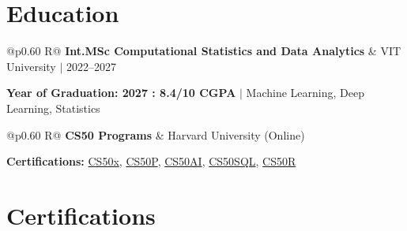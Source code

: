 \documentclass[a4paper,11pt]{article}
\newcommand{\subheading}[1]{\textbf{#1}}
\newcommand{\meta}[1]{{\fontsize{10}{12}\selectfont\textcolor[HTML]{3A3A3A}{#1}}}
\newcommand{\ulink}[2]{\href{#1}{#2}}
\begin{document}
\section{Education}
\vspace{2pt}

\begin{tabularx}{\linewidth}{@{}p{0.60\linewidth} R@{}}
\subheading{Int.MSc Computational Statistics and Data Analytics} & \meta{VIT University $|$ 2022--2027}
\end{tabularx}
{\color[HTML]{3A3A3A}\fontsize{11}{14}\selectfont \textbf{Year of Graduation: 2027 : 8.4/10 CGPA} $|$ Machine Learning, Deep Learning, Statistics}

\begin{tabularx}{\linewidth}{@{}p{0.60\linewidth} R@{}}
\subheading{CS50 Programs} & \meta{Harvard University (Online)}
\end{tabularx}
{\color[HTML]{3A3A3A}\fontsize{11}{14}\selectfont \textbf{Certifications:} \ulink{https://cs50.harvard.edu/certificates/b14b78df-e05c-413e-a607-1dd27303053a}{CS50x}, \ulink{https://cs50.harvard.edu/certificates/32477052-9db4-49c4-a5a4-d7e58429ca2c}{CS50P}, \ulink{https://cs50.harvard.edu/certificates/9cdb4d4a-1250-4f8e-9fd7-191864e0f919}{CS50AI}, \ulink{https://cs50.harvard.edu/certificates/bc486f24-f085-4e61-8536-80940b97a1b9}{CS50SQL}, \ulink{https://cs50.harvard.edu/certificates/666838e6-a053-4d82-b179-a60fe745fd84}{CS50R}}

\section{Certifications}
\vspace{2pt}
\end{document}
